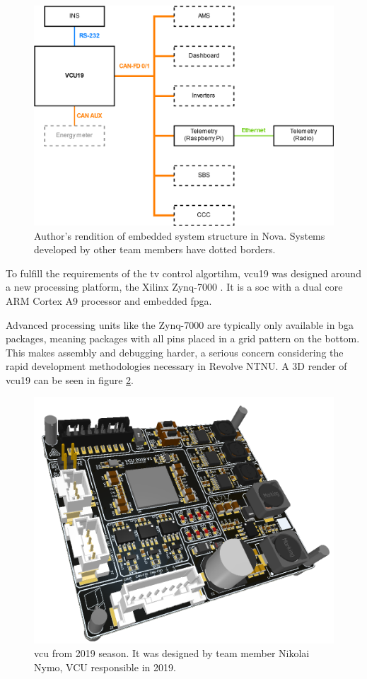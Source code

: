 \begin{figure}[H]
    \centering
    \includegraphics[width=.85\textwidth]{media/vcu19_system.png}
    \caption{Author's rendition of embedded system structure in Nova. Systems developed by other team members have dotted borders.}
    \label{fig:vcu19_system}
\end{figure}

To fulfill the requirements of the \acrshort{tv} control algortihm, \acrfull{vcu19} was designed around a new processing platform, the Xilinx Zynq-7000 \cite{zynq}. It is a \acrfull{soc} with a dual core ARM Cortex A9 processor and embedded \acrfull{fpga}. 

Advanced processing units like the Zynq-7000 are typically only available in \acrfull{bga} packages, meaning packages with all pins placed in a grid pattern on the bottom. This makes assembly and debugging harder, a serious concern considering the rapid development methodologies necessary in Revolve NTNU. A 3D render of \acrshort{vcu19} can be seen in figure \ref{fig:vcu19}.

\begin{figure}[H]
    \centering
    \includegraphics[width=.95\textwidth]{media/vcu19.png}
    \caption{\acrshort{vcu} from 2019 season. It was designed by team member Nikolai Nymo, VCU responsible in 2019.}
    \label{fig:vcu19}
\end{figure}

